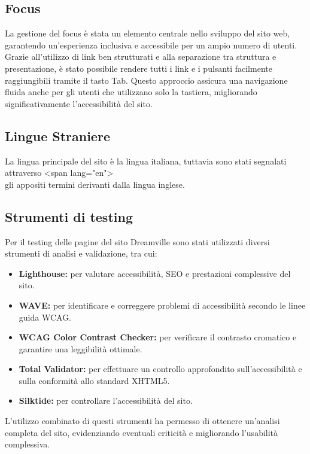 \subsection{Focus}
La gestione del focus è stata un elemento centrale nello sviluppo del sito web, garantendo un’esperienza inclusiva e accessibile per un ampio numero di utenti. Grazie all’utilizzo di link ben strutturati e alla separazione tra struttura e presentazione, è stato possibile rendere tutti i link e i pulsanti facilmente raggiungibili tramite il tasto Tab. Questo approccio assicura una navigazione fluida anche per gli utenti che utilizzano solo la tastiera, migliorando significativamente l’accessibilità del sito.
\subsection{Lingue Straniere}
La lingua principale del sito è la lingua italiana, tuttavia sono stati segnalati attraverso \textless span lang="en"\textgreater \\gli appositi termini derivanti dalla lingua inglese.
\subsection{Strumenti di testing}
Per il testing delle pagine del sito Dreamville sono stati utilizzati diversi strumenti di analisi e validazione, tra cui:
\begin{itemize}
    \item \textbf{Lighthouse:} per valutare accessibilità, SEO e prestazioni complessive del sito.
    \item \textbf{WAVE:} per identificare e correggere problemi di accessibilità secondo le linee guida WCAG.
    \item \textbf{WCAG Color Contrast Checker:} per verificare il contrasto cromatico e garantire una leggibilità ottimale.
    \item \textbf{Total Validator:} per effettuare un controllo approfondito sull'accessibilità e sulla conformità allo standard XHTML5.
    \item \textbf{Silktide:} per controllare l'accessibilità del sito.
\end{itemize}

L'utilizzo combinato di questi strumenti ha permesso di ottenere un'analisi completa del sito, evidenziando eventuali criticità e migliorando l'usabilità complessiva.
